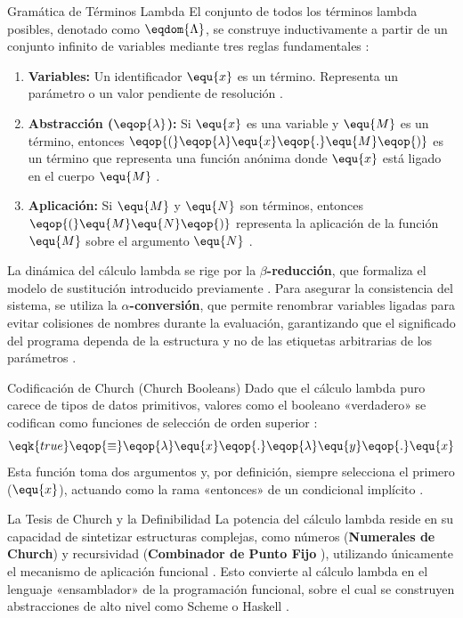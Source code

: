 \begin{definicion}{Gramática de Términos Lambda}
El conjunto de todos los términos lambda posibles, denotado como $\eqdom{\Lambda}$, se construye inductivamente a partir de un conjunto infinito de variables mediante tres reglas fundamentales \cite{PFPL, TAPL}:
\begin{enumerate}
    \item \textbf{Variables:} Un identificador $\equ{x}$ es un término. Representa un parámetro o un valor pendiente de resolución \cite{PFPL}.
    \item \textbf{Abstracción ($\eqop{\lambda}$):} Si $\equ{x}$ es una variable y $\equ{M}$ es un término, entonces $\eqop{(}\eqop{\lambda} \equ{x} \eqop{.} \equ{M}\eqop{)}$ es un término que representa una función anónima donde $\equ{x}$ está ligado en el cuerpo $\equ{M}$ \cite{PFPL, TAPL}.
    \item \textbf{Aplicación:} Si $\equ{M}$ y $\equ{N}$ son términos, entonces $\eqop{(}\equ{M} \equ{N}\eqop{)}$ representa la aplicación de la función $\equ{M}$ sobre el argumento $\equ{N}$ \cite{PFPL, TAPL}.
\end{enumerate}
\end{definicion}

La dinámica del cálculo lambda se rige por la \textbf{$\beta$-reducción}, que formaliza el modelo de sustitución introducido previamente \cite{SICP, PFPL}. Para asegurar la consistencia del sistema, se utiliza la \textbf{$\alpha$-conversión}, que permite renombrar variables ligadas para evitar colisiones de nombres durante la evaluación, garantizando que el significado del programa dependa de la estructura y no de las etiquetas arbitrarias de los parámetros \cite{PFPL}.

\begin{ejemplo}{Codificación de Church (Church Booleans)}
Dado que el cálculo lambda puro carece de tipos de datos primitivos, valores como el booleano «verdadero» se codifican como funciones de selección de orden superior \cite{TAPL, PFPL}:
\begin{equation}
    \eqk{true} \eqop{\equiv} \eqop{\lambda} \equ{x} \eqop{.} \eqop{\lambda} \equ{y} \eqop{.} \equ{x}
\end{equation}
Esta función toma dos argumentos y, por definición, siempre selecciona el primero ($\equ{x}$), actuando como la rama «entonces» de un condicional implícito \cite{TAPL}.
\end{ejemplo}

\begin{observacion}{La Tesis de Church y la Definibilidad}
La potencia del cálculo lambda reside en su capacidad de sintetizar estructuras complejas, como números (\textbf{Numerales de Church}) y recursividad (\textbf{Combinador de Punto Fijo} ), utilizando únicamente el mecanismo de aplicación funcional \cite{PFPL, TAPL}. Esto convierte al cálculo lambda en el lenguaje «ensamblador» de la programación funcional, sobre el cual se construyen abstracciones de alto nivel como Scheme o Haskell \cite{HtDP, SICP}.
\end{observacion}

